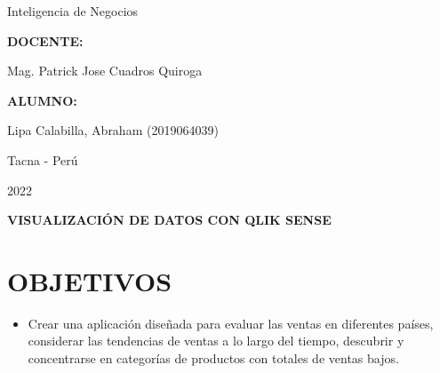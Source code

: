 \documentclass[12pt,letterpaper]{article}
\begin{document}
\begin{titlepage}
\begin{center}
\begin{large}
                Inteligencia de Negocios\\
            \end{large}
            \vspace*{0.2in}
            \begin{Large}
                \textbf{DOCENTE:} \\
            \end{Large}
            \vspace*{0.1in}
            \begin{large}
                Mag. Patrick Jose Cuadros Quiroga\\
            \end{large}
            \vspace*{0.3in}
            \begin{large}
                \textbf{ALUMNO:} \\
                \begin{flushleft}
                    Lipa Calabilla, Abraham  		\hfill	(2019064039) \\
                \end{flushleft}
            \end{large}
            \vspace*{1.3in}
            \begin{large}
                Tacna - Perú\\
            \end{large}
            \vspace*{0.1in}
            \begin{large}
                2022\\
            \end{large}
        \end{center}
    \end{titlepage}
    
    \newpage
    \tableofcontents
    \justify
    \newpage
    \begin{LARGE}
        \begin{center}
            \textbf{VISUALIZACIÓN DE DATOS CON QLIK SENSE} \\
        \end{center}
    \end{LARGE}
    \section{OBJETIVOS}
    \begin{itemize}
        \item Crear una aplicación diseñada para evaluar las ventas en diferentes países, considerar las tendencias de ventas a lo largo del tiempo, descubrir y concentrarse en categorías de productos con totales de ventas bajos.
    \end{itemize}
\end{document}
